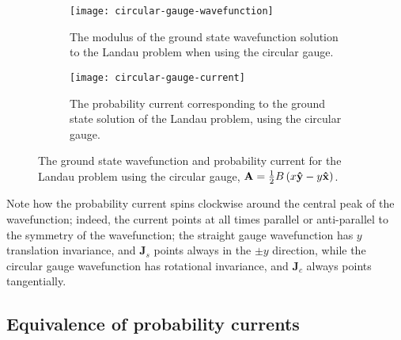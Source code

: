 \begin{figure}
    \centering
    \begin{subfigure}{0.45\linewidth}
        \centering
        \texttt{[image: circular-gauge-wavefunction]}
        \caption{The modulus of the ground state wavefunction solution to the
            Landau problem when using the circular gauge.}
        \label{subfig:circular-wavefunction}
    \end{subfigure}
    \begin{subfigure}{0.45\linewidth}
        \centering
        \texttt{[image: circular-gauge-current]}
        \caption{The probability current corresponding to the ground state solution
            of the Landau problem, using the circular gauge.}
        \label{subfig:circular-current}
    \end{subfigure}
    \caption{The ground state wavefunction and probability current for the
        Landau problem using the circular gauge, $\mathbf{A} = \frac{1}{2} B
        \left( x\mathbf{\hat y } - y\mathbf{\hat x } \right)$.}
    \label{fig:circular}
\end{figure}

Note how the probability current spins clockwise around the central peak of the
wavefunction; indeed, the current points at all times parallel or anti-parallel
to the symmetry of the wavefunction; the straight gauge wavefunction has $y$
translation invariance, and $\mathbf{J}_s$ points always in the $\pm y$
direction, while the circular gauge wavefunction has rotational invariance, and
$\mathbf{J}_c$ always points tangentially.

\subsection{Equivalence of probability currents}

